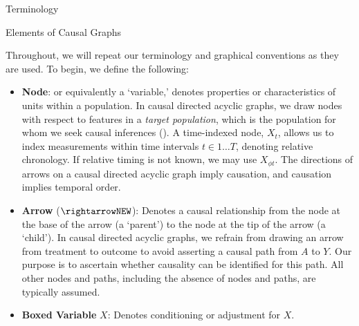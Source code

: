 \documentclass[
  single column]{article}
\begin{document}
\begin{table}

\caption{\label{tbl-terminologylocalconventions}Terminology}

\centering{

\terminologylocalconventions

}

\end{table}%

\begin{table}

\caption{\label{tbl-terminologygeneral}Elements of Causal Graphs}

\centering{

\terminologygeneral

}

\end{table}%

Throughout, we will repeat our terminology and graphical conventions as
they are used. To begin, we define the following:

\begin{itemize}
\item
  \textbf{Node}: or equivalently a `variable,' denotes properties or
  characteristics of units within a population. In causal directed
  acyclic graphs, we draw nodes with respect to features in a
  \emph{target population}, which is the population for whom we seek
  causal inferences (). A time-indexed node, \(X_t\), allows us to index measurements
  within time intervals \(t \in 1\dots T\), denoting relative
  chronology. If relative timing is not known, we may use
  \(X_{\phi t}\). The directions of arrows on a causal directed acyclic
  graph imply causation, and causation implies temporal order.
\item
  \textbf{Arrow} (\(\rightarrowNEW\)): Denotes a causal relationship
  from the node at the base of the arrow (a `parent') to the node at the
  tip of the arrow (a `child'). In causal directed acyclic graphs, we
  refrain from drawing an arrow from treatment to outcome to avoid
  asserting a causal path from \(A\) to \(Y\). Our purpose is to
  ascertain whether causality can be identified for this path. All other
  nodes and paths, including the absence of nodes and paths, are
  typically assumed.
\item
  \textbf{Boxed Variable} \(\boxed{X}\): Denotes conditioning or
  adjustment for \(X\).
\end{itemize}
\end{document}
